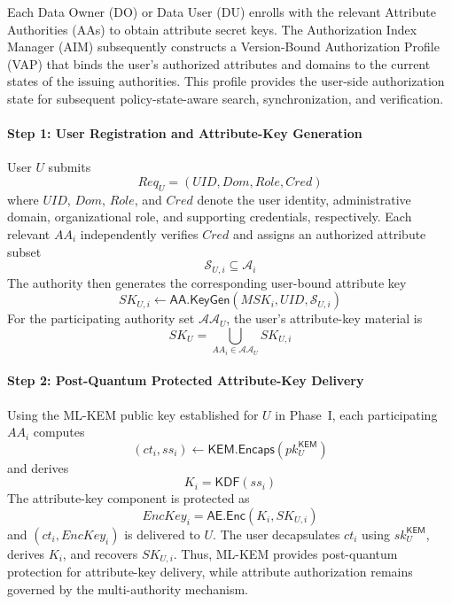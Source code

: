 \documentclass{ieeetj}
\theoremstyle{ieee-style}
\begin{document}
Each Data Owner (DO) or Data User (DU) enrolls with the relevant
Attribute Authorities (AAs) to obtain attribute secret keys. The
Authorization Index Manager (AIM) subsequently constructs a
Version-Bound Authorization Profile (VAP) that binds the user's
authorized attributes and domains to the current states of the issuing
authorities. This profile provides the user-side authorization state for
subsequent policy-state-aware search, synchronization, and verification.

\paragraph*{Step 1: User Registration and Attribute-Key Generation}

User $U$ submits
\begin{equation}
Req_U=(UID,Dom,Role,Cred)
\end{equation}
where $UID$, $Dom$, $Role$, and $Cred$ denote the user identity,
administrative domain, organizational role, and supporting credentials,
respectively. Each relevant $AA_i$ independently verifies $Cred$ and
assigns an authorized attribute subset
\begin{equation}
\mathcal{S}_{U,i}\subseteq\mathcal{A}_i
\end{equation}
The authority then generates the corresponding user-bound attribute key
\begin{equation}
SK_{U,i}
\leftarrow
\mathsf{AA.KeyGen}
(MSK_i,UID,\mathcal{S}_{U,i})
\end{equation}
For the participating authority set $\mathcal{AA}_U$, the user's
attribute-key material is
\begin{equation}
SK_U=
\bigcup_{AA_i\in\mathcal{AA}_U}SK_{U,i}
\end{equation}

\paragraph*{Step 2: Post-Quantum Protected Attribute-Key Delivery}

Using the ML-KEM public key established for $U$ in Phase~I, each
participating $AA_i$ computes
\begin{equation}
(ct_i,ss_i)
\leftarrow
\mathsf{KEM.Encaps}(pk_U^{\mathsf{KEM}})
\end{equation}
and derives
\begin{equation}
K_i=\mathsf{KDF}(ss_i)
\end{equation}
The attribute-key component is protected as
\begin{equation}
EncKey_i=
\mathsf{AE.Enc}(K_i,SK_{U,i})
\end{equation}
and $(ct_i,EncKey_i)$ is delivered to $U$. The user decapsulates $ct_i$
using $sk_U^{\mathsf{KEM}}$, derives $K_i$, and recovers $SK_{U,i}$.
Thus, ML-KEM provides post-quantum protection for attribute-key delivery,
while attribute authorization remains governed by the multi-authority
mechanism.
\end{document}
